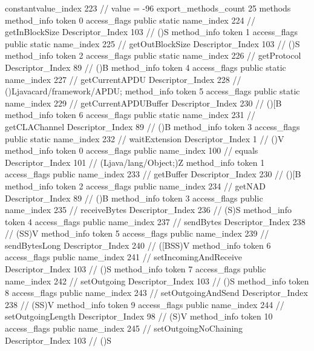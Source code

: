 {{{{{{{					constantvalue_index	223		// value = -96
				}
				}
			}
			}
			export_methods_count	25
			methods {
				method_info {
					token	0
					access_flags	public static
					name_index	224		// getInBlockSize
					Descriptor_Index	103		// ()S
				}
				method_info {
					token	1
					access_flags	public static
					name_index	225		// getOutBlockSize
					Descriptor_Index	103		// ()S
				}
				method_info {
					token	2
					access_flags	public static
					name_index	226		// getProtocol
					Descriptor_Index	89		// ()B
				}
				method_info {
					token	4
					access_flags	public static
					name_index	227		// getCurrentAPDU
					Descriptor_Index	228		// ()Ljavacard/framework/APDU;
				}
				method_info {
					token	5
					access_flags	public static
					name_index	229		// getCurrentAPDUBuffer
					Descriptor_Index	230		// ()[B
				}
				method_info {
					token	6
					access_flags	public static
					name_index	231		// getCLAChannel
					Descriptor_Index	89		// ()B
				}
				method_info {
					token	3
					access_flags	public static
					name_index	232		// waitExtension
					Descriptor_Index	1		// ()V
				}
				method_info {
					token	0
					access_flags	public
					name_index	100		// equals
					Descriptor_Index	101		// (Ljava/lang/Object;)Z
				}
				method_info {
					token	1
					access_flags	public
					name_index	233		// getBuffer
					Descriptor_Index	230		// ()[B
				}
				method_info {
					token	2
					access_flags	public
					name_index	234		// getNAD
					Descriptor_Index	89		// ()B
				}
				method_info {
					token	3
					access_flags	public
					name_index	235		// receiveBytes
					Descriptor_Index	236		// (S)S
				}
				method_info {
					token	4
					access_flags	public
					name_index	237		// sendBytes
					Descriptor_Index	238		// (SS)V
				}
				method_info {
					token	5
					access_flags	public
					name_index	239		// sendBytesLong
					Descriptor_Index	240		// ([BSS)V
				}
				method_info {
					token	6
					access_flags	public
					name_index	241		// setIncomingAndReceive
					Descriptor_Index	103		// ()S
				}
				method_info {
					token	7
					access_flags	public
					name_index	242		// setOutgoing
					Descriptor_Index	103		// ()S
				}
				method_info {
					token	8
					access_flags	public
					name_index	243		// setOutgoingAndSend
					Descriptor_Index	238		// (SS)V
				}
				method_info {
					token	9
					access_flags	public
					name_index	244		// setOutgoingLength
					Descriptor_Index	98		// (S)V
				}
				method_info {
					token	10
					access_flags	public
					name_index	245		// setOutgoingNoChaining
					Descriptor_Index	103		// ()S
}}}}}
